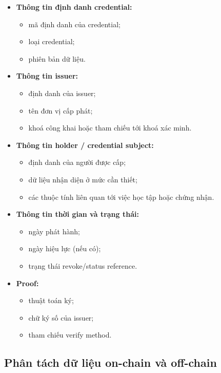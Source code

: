 \begin{itemize}
    \item \textbf{Thông tin định danh credential:}
    \begin{itemize}
        \item mã định danh của credential;
        \item loại credential;
        \item phiên bản dữ liệu.
    \end{itemize}

    \item \textbf{Thông tin issuer:}
    \begin{itemize}
        \item định danh của issuer;
        \item tên đơn vị cấp phát;
        \item khoá công khai hoặc tham chiếu tới khoá xác minh.
    \end{itemize}

    \item \textbf{Thông tin holder / credential subject:}
    \begin{itemize}
        \item định danh của người được cấp;
        \item dữ liệu nhận diện ở mức cần thiết;
        \item các thuộc tính liên quan tới việc học tập hoặc chứng nhận.
    \end{itemize}

    \item \textbf{Thông tin thời gian và trạng thái:}
    \begin{itemize}
        \item ngày phát hành;
        \item ngày hiệu lực (nếu có);
        \item trạng thái revoke/status reference.
    \end{itemize}

    \item \textbf{Proof:}
    \begin{itemize}
        \item thuật toán ký;
        \item chữ ký số của issuer;
        \item tham chiếu verify method.
    \end{itemize}
\end{itemize}

\subsection{Phân tách dữ liệu on-chain và off-chain}

